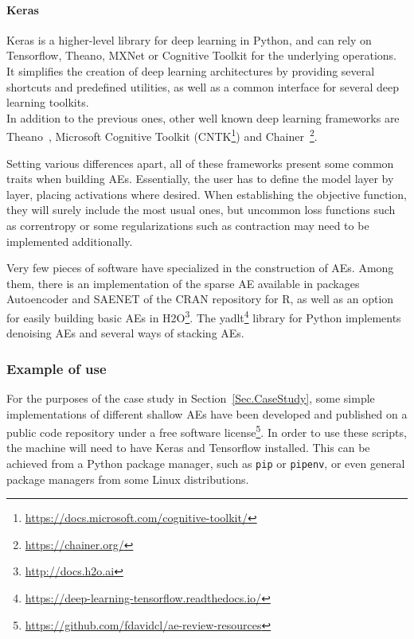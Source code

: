 \documentclass[preprint,5p,compress]{elsarticle}
\begin{document}
\paragraph{Keras \cite{Keras}} Keras is a higher-level library for deep learning in Python, and can rely on Tensorflow, Theano, MXNet or Cognitive Toolkit for the underlying operations. It simplifies the creation of deep learning architectures by providing several shortcuts and predefined utilities, as well as a common interface for several deep learning toolkits.\\

In addition to the previous ones, other well known deep learning frameworks are Theano~\cite{Theano}, Microsoft Cognitive Toolkit (CNTK\footnote{\url{https://docs.microsoft.com/cognitive-toolkit/}}) and Chainer~\footnote{\url{https://chainer.org/}}.

Setting various differences apart, all of these frameworks present some common traits when building AEs. Essentially, the user has to define the model layer by layer, placing activations where desired. When establishing the objective function, they will surely include the most usual ones, but uncommon loss functions such as correntropy or some regularizations such as contraction may need to be implemented additionally.

Very few pieces of software have specialized in the construction of AEs. Among them, there is an implementation of the sparse AE available in packages Autoencoder \cite{CRANautoencoder} and SAENET \cite{SAENET} of the CRAN repository for R, as well as an option for easily building basic AEs in H2O\footnote{\url{http://docs.h2o.ai}}. The yadlt\footnote{\url{https://deep-learning-tensorflow.readthedocs.io/}} library for Python implements denoising AEs and several ways of stacking AEs.

\subsubsection{Example of use}

For the purposes of the case study in Section~\ref{Sec.CaseStudy}, some simple implementations of different shallow AEs have been developed and published on a public code repository under a free software license\footnote{\url{https://github.com/fdavidcl/ae-review-resources}}. In order to use these scripts, the machine will need to have Keras and Tensorflow installed. This can be achieved from a Python package manager, such as \texttt{pip} or \texttt{pipenv}, or even general package managers from some Linux distributions.
\end{document}
